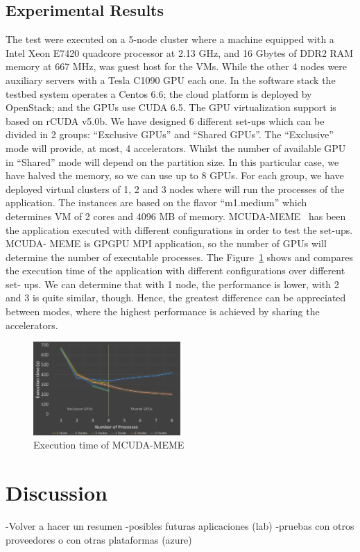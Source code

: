 \documentclass[a4paper,twoside]{article}
\begin{document}
\subsection{Experimental Results}
The test were executed on a 5-node cluster where a machine
equipped with a Intel Xeon E7420 quadcore processor at
2.13 GHz, and 16 Gbytes of DDR2 RAM memory at 667
MHz, was guest host for the VMs. While the other 4 nodes
were auxiliary servers with a Tesla C1090 GPU each one. 
In the software stack the testbed system operates a
Centos 6.6; the cloud platform is deployed by OpenStack; and
the GPUs use CUDA 6.5. The GPU virtualization support is
based on rCUDA v5.0b.
We have designed 6 different set-ups which can be divided
in 2 groups: “Exclusive GPUs” and “Shared GPUs”. The
“Exclusive” mode will provide, at most, 4 accelerators. Whilst
the number of available GPU in “Shared” mode will depend
on the partition size. In this particular case, we have halved
the memory, so we can use up to 8 GPUs. For each group, we
have deployed virtual clusters of 1, 2 and 3 nodes where will
run the processes of the application. The instances are based
on the flavor “m1.medium” which determines VM of 2 cores
and 4096 MB of memory.
MCUDA-MEME~\cite{Liu2010} has been the application executed with
different configurations in order to test the set-ups. MCUDA-
MEME is GPGPU MPI application, so the number of GPUs
will determine the number of executable processes.
The Figure~\ref{fig3} shows and compares the execution time of
the application with different configurations over different set-
ups. We can determine that with 1 node, the performance is
lower, with 2 and 3 is quite similar, though. Hence, the greatest
difference can be appreciated between modes, where the
highest performance is achieved by sharing the accelerators.

\begin{figure}[!t]
  \centering
  \includegraphics[width=0.5\textwidth]{images/chart.jpg}
  \caption{Execution time of MCUDA-MEME}
  \label{fig3}
\end{figure}

\section{Discussion}
\label{sec:discussion}
-Volver a hacer un resumen
-posibles futuras aplicaciones (lab)
-pruebas con otros proveedores o con otras plataformas (azure)
\end{document}
